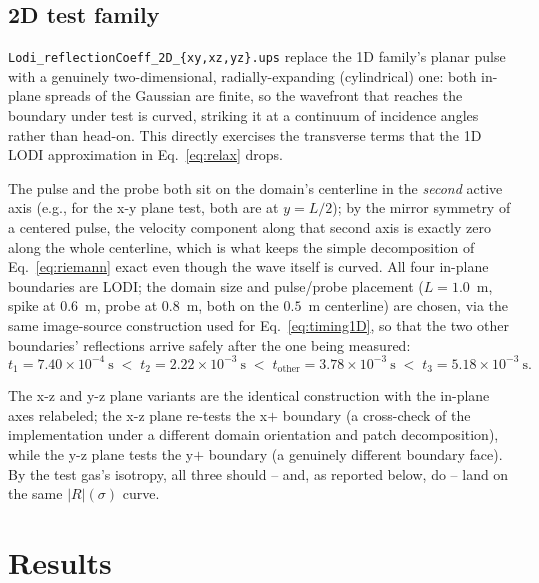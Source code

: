 \documentclass[11pt]{article}
\begin{document}
\subsection{2D test family}
\label{sec:methodology-2D}

\texttt{Lodi\_reflectionCoeff\_2D\_\{xy,xz,yz\}.ups} replace the 1D family's
planar pulse with a genuinely two-dimensional, radially-expanding
(cylindrical) one: both in-plane spreads of the Gaussian are finite, so the
wavefront that reaches the boundary under test is curved, striking it at a
continuum of incidence angles rather than head-on. This directly exercises
the transverse terms that the 1D LODI approximation in
Eq.~\eqref{eq:relax} drops.

The pulse and the probe both sit on the domain's centerline in the
\emph{second} active axis (e.g., for the x-y plane test, both are at
$y=L/2$); by the mirror symmetry of a centered pulse, the velocity
component along that second axis is exactly zero along the whole
centerline, which is what keeps the simple decomposition of
Eq.~\eqref{eq:riemann} exact even though the wave itself is curved. All four
in-plane boundaries are LODI; the domain size and pulse/probe placement
($L=1.0$~m, spike at $0.6$~m, probe at $0.8$~m, both on the $0.5$~m
centerline) are chosen, via the same image-source construction used for
Eq.~\eqref{eq:timing1D}, so that the two other boundaries' reflections
arrive safely after the one being measured:
\begin{equation}
  t_1 = 7.40\times10^{-4}\ \text{s} \;<\;
  t_2 = 2.22\times10^{-3}\ \text{s} \;<\;
  t_{\text{other}} = 3.78\times10^{-3}\ \text{s} \;<\;
  t_3 = 5.18\times10^{-3}\ \text{s}.
  \label{eq:timing2D}
\end{equation}

The x-z and y-z plane variants are the identical construction with the
in-plane axes relabeled; the x-z plane re-tests the x$+$ boundary (a
cross-check of the implementation under a different domain orientation and
patch decomposition), while the y-z plane tests the y$+$ boundary (a
genuinely different boundary face). By the test gas's isotropy, all three
should -- and, as reported below, do -- land on the same $|R|(\sigma)$
curve.

\section{Results}
\label{sec:results}
\end{document}

